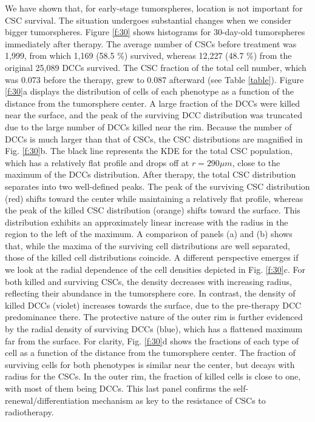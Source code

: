 \documentclass[10pt,letterpaper]{article}
\begin{document}
We have shown that, for early-stage tumorspheres, location is not important for CSC survival. The situation undergoes substantial changes when we consider bigger tumorspheres.
Figure \ref{f:30} shows histograms for 30-day-old tumorspheres immediately after therapy. The average number of CSCs before treatment was 1,999, from which 1,169 (58.5 \%) survived, whereas 12,227 (48.7 \%) from the original 25,089 DCCs survived. The CSC fraction of the total cell number, which was 0.073 before the therapy, grew to 0.087 afterward (see Table \ref{table}). Figure \ref{f:30}a displays the distribution of cells of each phenotype as a function of the distance from the tumorsphere center. A large fraction of the DCCs were killed near the surface, and the peak of the surviving DCC distribution was truncated due to the large number of DCCs killed near the rim. Because the number of DCCs is much larger than that of CSCs, the CSC distributions are magnified in Fig. \ref{f:30}b. The black line represents the KDE for the total CSC population, which has a relatively flat profile and drops off at $r=290 \mu m$, close to the maximum of the DCCs distribution. After therapy, the total CSC distribution separates into two well-defined peaks. The peak of the surviving CSC distribution (red) shifts toward the center while maintaining a relatively flat profile, whereas the peak of the killed CSC distribution (orange) shifts toward the surface. This distribution exhibits an approximately linear increase with the radius in the region to the left of the maximum. A comparison of panels (a) and (b) shows that, while the maxima of the surviving cell distributions are well separated, those of the killed cell distributions coincide. A different perspective emerges if we look at the radial dependence of the cell densities depicted in Fig. \ref{f:30}c. For both killed and surviving CSCs, the density  decreases with increasing radius, reflecting their  abundance in the tumorsphere core. In contrast, the density of killed DCCs (violet) increases towards the surface, due to the pre-therapy DCC predominance there. The protective nature of the outer rim is further evidenced by the radial density of surviving DCCs (blue), which has a flattened maximum  far from the surface.  For clarity, Fig. \ref{f:30}d shows the fractions of each type of cell as a function of the distance from the tumorsphere center.  The fraction of surviving cells for both  phenotypes is similar near the center, but decays with radius for the CSCs. In the outer rim, the fraction of killed cells is close to one, with most of them being DCCs. This last panel confirms the self-renewal/differentiation mechanism as key to the resistance of CSCs to radiotherapy.
\end{document}
